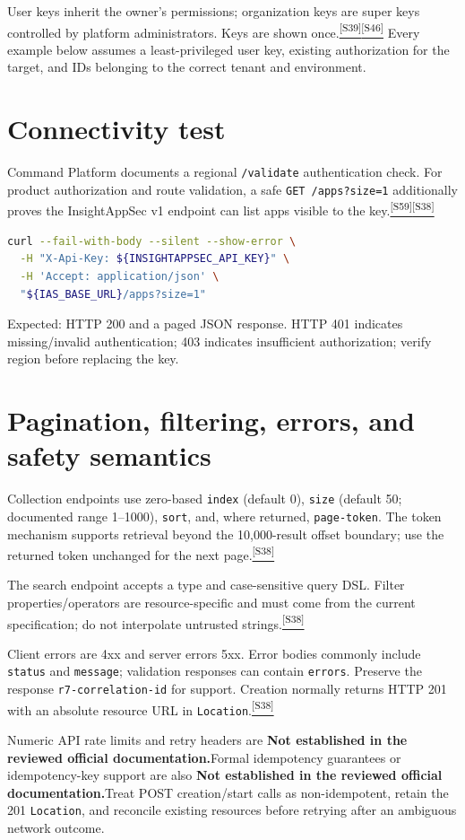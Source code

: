 \documentclass[11pt,letterpaper,oneside]{scrreprt}
\newcommand{\src}[1]{\hyperref[src:#1]{\textsuperscript{\color{R7Orange}[#1]}}}
\newcommand{\code}[1]{\texttt{#1}}
\newcommand{\notestablished}{\textbf{Not established in the reviewed official documentation.}}
\begin{document}
User keys inherit the owner's permissions; organization keys are super keys controlled by platform administrators. Keys are shown once.\src{S39}\src{S46} Every example below assumes a least-privileged user key, existing authorization for the target, and IDs belonging to the correct tenant and environment.

\section{Connectivity test}
Command Platform documents a regional \code{/validate} authentication check. For product authorization and route validation, a safe \code{GET /apps?size=1} additionally proves the InsightAppSec v1 endpoint can list apps visible to the key.\src{S59}\src{S38}

\begin{lstlisting}[language=bash]
curl --fail-with-body --silent --show-error \
  -H "X-Api-Key: ${INSIGHTAPPSEC_API_KEY}" \
  -H 'Accept: application/json' \
  "${IAS_BASE_URL}/apps?size=1"
\end{lstlisting}
Expected: HTTP 200 and a paged JSON response. HTTP 401 indicates missing/invalid authentication; 403 indicates insufficient authorization; verify region before replacing the key.

\section{Pagination, filtering, errors, and safety semantics}
Collection endpoints use zero-based \code{index} (default 0), \code{size} (default 50; documented range 1--1000), \code{sort}, and, where returned, \code{page-token}. The token mechanism supports retrieval beyond the 10,000-result offset boundary; use the returned token unchanged for the next page.\src{S38}

The search endpoint accepts a type and case-sensitive query DSL. Filter properties/operators are resource-specific and must come from the current specification; do not interpolate untrusted strings.\src{S38}

Client errors are 4xx and server errors 5xx. Error bodies commonly include \code{status} and \code{message}; validation responses can contain \code{errors}. Preserve the response \code{r7-correlation-id} for support. Creation normally returns HTTP 201 with an absolute resource URL in \code{Location}.\src{S38}

\begin{docgap}[Rate limits and idempotency]
Numeric API rate limits and retry headers are \notestablished Formal idempotency guarantees or idempotency-key support are also \notestablished Treat POST creation/start calls as non-idempotent, retain the 201 \code{Location}, and reconcile existing resources before retrying after an ambiguous network outcome.
\end{docgap}
\end{document}
